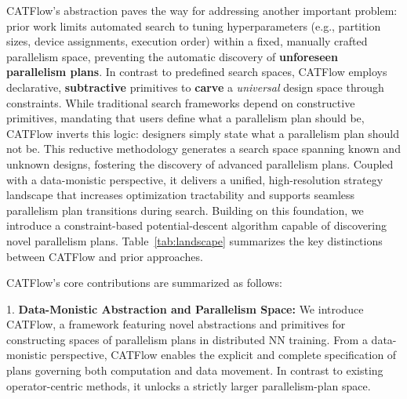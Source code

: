 \documentclass[letterpaper,twocolumn,10pt]{article}
\newcommand{\name}{CATFlow}
\begin{document}

\name{}'s abstraction paves the way for addressing another important problem: prior work limits automated search to tuning hyperparameters (e.g., partition sizes, device assignments, execution order) within a fixed, manually crafted parallelism space, preventing the automatic discovery of \textbf{unforeseen parallelism plans}. In contrast to predefined search spaces, \name{} employs declarative, \textbf{subtractive} primitives to \textbf{carve} a \textit{universal} design space through constraints. While traditional search frameworks depend on constructive primitives, mandating that users define what a parallelism plan should be, \name{} inverts this logic: designers simply state what a parallelism plan should not be. This reductive methodology generates a search space spanning known and unknown designs, fostering the discovery of advanced parallelism plans. Coupled with a data-monistic perspective, it delivers a unified, high-resolution strategy landscape that increases optimization tractability and supports seamless parallelism plan transitions during search. Building on this foundation, we introduce a constraint-based potential-descent algorithm capable of discovering novel parallelism plans. Table~\ref{tab:landscape} summarizes the key distinctions between \name{} and prior approaches.

\name{}'s core contributions are summarized as follows:

1. \textbf{Data-Monistic Abstraction and Parallelism Space:} We introduce \name{}, a framework featuring novel abstractions and primitives for constructing spaces of parallelism plans in distributed NN training. From a data-monistic perspective, \name{} enables the explicit and complete specification of plans governing both computation and data movement. In contrast to existing operator-centric methods, it unlocks a strictly larger parallelism-plan space.
\end{document}

